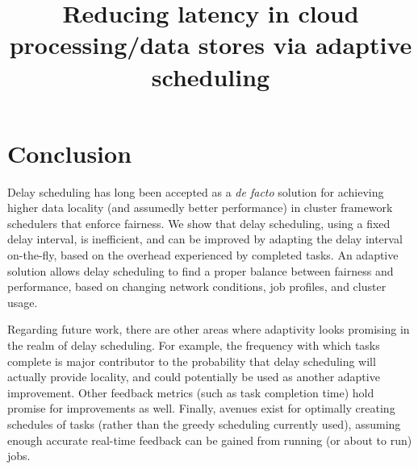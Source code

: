 \documentclass[10pt,conference,compsocconf,letterpaper]{IEEEtran}
\begin{document}


\title{Reducing latency in cloud processing/data stores via adaptive scheduling}

\date{}
\maketitle



\begin{abstract}
%

\end{abstract}










\section{Conclusion}\label{sec:conclusion}

Delay scheduling has long been accepted as a \textit{de facto} solution for achieving
higher data locality (and assumedly better performance) in cluster framework schedulers that
enforce fairness. We show that 
delay scheduling, using a fixed delay interval, is inefficient, and can be improved by 
adapting the delay interval on-the-fly, based on the overhead experienced by completed tasks. 
An adaptive solution allows delay scheduling to find a proper balance between fairness and
performance, based on changing network conditions, job profiles, and cluster usage.

Regarding future work, there are other areas where adaptivity looks promising in the realm of
delay scheduling. For example, the frequency with which tasks complete is major contributor
to the probability that delay scheduling will actually provide locality, and could potentially
be used as another adaptive improvement. Other feedback metrics (such as task completion time) 
hold promise for improvements as well. Finally, avenues exist for optimally creating 
schedules of tasks (rather than the greedy scheduling currently used), assuming enough accurate
real-time feedback can be gained from running (or about to run) jobs. 





%
{}
%

\end{document}
